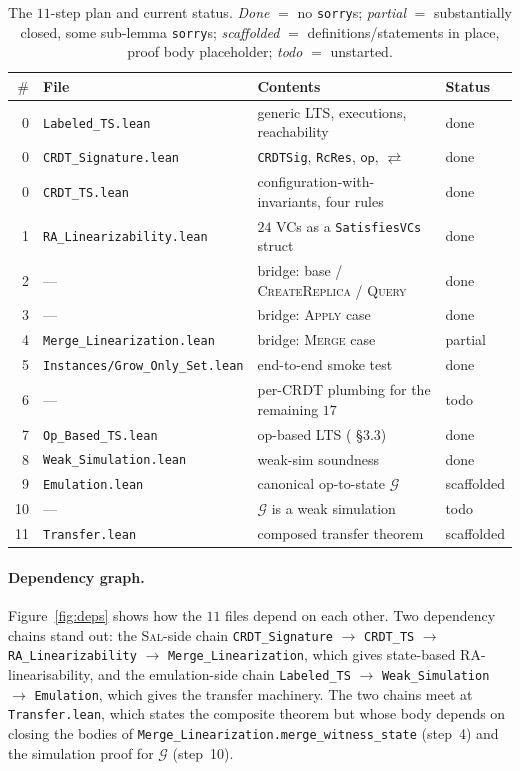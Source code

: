 \documentclass[11pt,a4paper]{article}
\theoremstyle{definition}
\theoremstyle{remark}
\newcommand{\Op}{\mathsf{op}}
\newcommand{\commute}{\mathrel{\rightleftarrows}}
\newcommand{\Sal}{\textsc{Sal}}
\newcommand{\Emul}{\mathcal{G}}
\newcommand{\sorry}{\texttt{sorry}}
\begin{document}
\begin{table}[t]
  \centering
  \small
  \begin{tabular}{@{}rlp{7.8cm}l@{}}
    \toprule
    $\#$ & File & Contents & Status \\
    \midrule
    0 & \texttt{Labeled\_TS.lean} & generic LTS, executions, reachability & done \\
    0 & \texttt{CRDT\_Signature.lean} & \texttt{CRDTSig}, \texttt{RcRes}, $\Op$, $\commute$ & done \\
    0 & \texttt{CRDT\_TS.lean} & configuration-with-invariants, four rules & done \\
    1 & \texttt{RA\_Linearizability.lean} & $24$ VCs as a \texttt{SatisfiesVCs} struct & done \\
    2 & --- & bridge: base / \textsc{CreateReplica} / \textsc{Query} & done \\
    3 & --- & bridge: \textsc{Apply} case & done \\
    4 & \texttt{Merge\_Linearization.lean} & bridge: \textsc{Merge} case & partial \\
    5 & \texttt{Instances/Grow\_Only\_Set.lean} & end-to-end smoke test & done \\
    6 & --- & per-CRDT plumbing for the remaining $17$ & todo \\
    7 & \texttt{Op\_Based\_TS.lean} & op-based LTS (\cite{liittschwager2025} \S3.3) & done \\
    8 & \texttt{Weak\_Simulation.lean} & weak-sim soundness & done \\
    9 & \texttt{Emulation.lean} & canonical op-to-state $\Emul$ & scaffolded \\
    10 & --- & $\Emul$ is a weak simulation & todo \\
    11 & \texttt{Transfer.lean} & composed transfer theorem & scaffolded \\
    \bottomrule
  \end{tabular}
  \caption{The $11$-step plan and current status.
    \emph{Done} $=$ no \sorry{}s; \emph{partial} $=$ substantially
    closed, some sub-lemma \sorry{}s; \emph{scaffolded} $=$
    definitions/statements in place, proof body placeholder;
    \emph{todo} $=$ unstarted.}
  \label{tab:status}
\end{table}

\paragraph{Dependency graph.}
Figure~\ref{fig:deps} shows how the $11$ files depend on each other.
Two dependency chains stand out: the \Sal{}-side chain
\texttt{CRDT\_Signature} $\to$ \texttt{CRDT\_TS} $\to$
\texttt{RA\_Linearizability} $\to$ \texttt{Merge\_Linearization},
which gives state-based RA-linearisability, and the emulation-side
chain \texttt{Labeled\_TS} $\to$ \texttt{Weak\_Simulation}
$\to$ \texttt{Emulation}, which gives the transfer machinery. The
two chains meet at \texttt{Transfer.lean}, which states the
composite theorem but whose body depends on closing the bodies of
\texttt{Merge\_Linearization.merge\_witness\_state} (step~4) and the
simulation proof for $\Emul$ (step~10).
\end{document}
